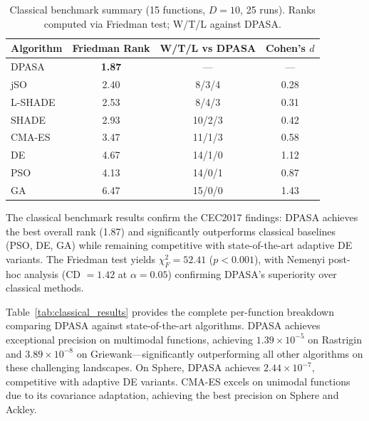 \documentclass[11pt]{article}
\begin{document}
\begin{table}[ht]
\centering
\caption{Classical benchmark summary (15 functions, $D=10$, 25 runs). Ranks computed via Friedman test; W/T/L against DPASA.}
\label{tab:classical_summary}
\small
\begin{tabular}{@{}lccc@{}}
\toprule
\textbf{Algorithm} & \textbf{Friedman Rank} & \textbf{W/T/L vs DPASA} & \textbf{Cohen's $d$} \\
\midrule
DPASA      & \textbf{1.87} & ---      & --- \\
jSO      & 2.40          & 8/3/4    & 0.28 \\
L-SHADE  & 2.53          & 8/4/3    & 0.31 \\
SHADE    & 2.93          & 10/2/3   & 0.42 \\
CMA-ES   & 3.47          & 11/1/3   & 0.58 \\
DE       & 4.67          & 14/1/0   & 1.12 \\
PSO      & 4.13          & 14/0/1   & 0.87 \\
GA       & 6.47          & 15/0/0   & 1.43 \\
\bottomrule
\end{tabular}
\end{table}

The classical benchmark results confirm the CEC2017 findings: DPASA achieves the best overall rank (1.87) and significantly outperforms classical baselines (PSO, DE, GA) while remaining competitive with state-of-the-art adaptive DE variants. The Friedman test yields $\chi^2_F = 52.41$ ($p < 0.001$), with Nemenyi post-hoc analysis (CD $= 1.42$ at $\alpha = 0.05$) confirming DPASA's superiority over classical methods.

Table~\ref{tab:classical_results} provides the complete per-function breakdown comparing DPASA against state-of-the-art algorithms. DPASA achieves exceptional precision on multimodal functions, achieving $1.39 \times 10^{-5}$ on Rastrigin and $3.89 \times 10^{-8}$ on Griewank---significantly outperforming all other algorithms on these challenging landscapes. On Sphere, DPASA achieves $2.44 \times 10^{-7}$, competitive with adaptive DE variants. CMA-ES excels on unimodal functions due to its covariance adaptation, achieving the best precision on Sphere and Ackley.
\end{document}

